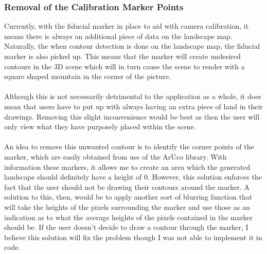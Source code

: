 \documentclass[11pt]{article}
\begin{document}
\subsubsection{Removal of the Calibration Marker Points}
Currently, with the fiducial marker in place to aid with camera
calibration, it means there is always an additional piece of data on the 
landscape map. Naturally, the when contour detection is done on the
landscape map, the fiducial marker is also picked up. This means that the 
marker will create undesired contours in the 3D scene which will in turn
cause the scene to render with a square shaped mountain in the corner of
the picture.\\
\\
Although this is not necessarily detrimental to the application as a whole,
it does mean that users have to put up with always having an extra 
piece of land in their drawings. Removing this slight inconvenience would
be best as then the user will only view what they have purposely placed
within the scene.\\
\\
An idea to remove this unwanted contour is to identify the corner points
of the marker, which are easily obtained from use of the ArUco library. 
With information these markers, it allows me to create an area which the
generated landscape should definitely have a height of 0. However, this
solution enforces the fact that the user should not be drawing their 
contours around the marker. A solution to this, then, would be to apply
another sort of blurring function that will take the heights of the pixels
surrounding the marker and use those as an indication as to what the
average heights of the pixels contained in the marker should be. If the user
doesn't decide to draw a contour through the marker, I believe this solution
will fix the problem though I was not able to implement it in code.
\end{document}
